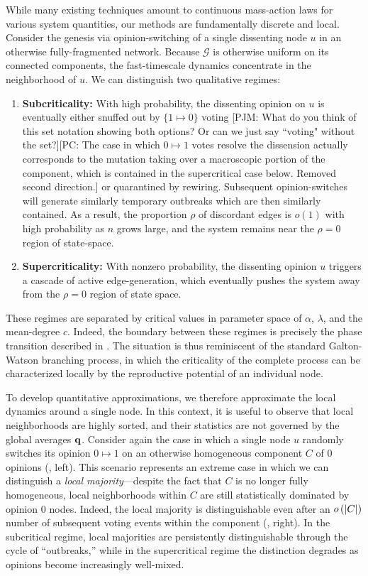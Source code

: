\documentclass[review, onefignum, onetabnum]{siamart171218}
\newcommand{\pjm}[1]{{\color{blue}[PJM: #1]}}
\newcommand{\pc}[1]{{\color{comment_purple}[PC: #1]}}
\begin{document}
	    While many existing techniques amount to continuous mass-action laws for various system quantities, our methods are fundamentally discrete and local. 
	    Consider the genesis via opinion-switching of a single dissenting node $u$ in an otherwise fully-fragmented network.  
	    Because $\mathcal{G}$ is otherwise uniform on its connected components, the fast-timescale dynamics concentrate in the neighborhood of $u$. 
    	We can distinguish two qualitative regimes: 
    	\begin{enumerate}
    		\item \textbf{Subcriticality:} With high probability, the dissenting opinion on $u$ is eventually either snuffed out by $\{1\mapsto 0\}$ voting \pjm{What do you think of this set notation showing both options? Or can we just say ``voting" without the set?}\pc{The case in which $0\mapsto1$ votes resolve the dissension actually corresponds to the mutation taking over a macroscopic portion of the component, which is contained in the supercritical case below. Removed second direction.} or quarantined by rewiring. 
    		Subsequent opinion-switches will generate similarly temporary outbreaks which are then similarly contained.   
    		As a result, the proportion $\rho$ of discordant edges is $o(1)$ with high probability as $n$ grows large, and the system remains near the $\rho = 0$ region of state-space. 
    		\item \textbf{Supercriticality:} With nonzero probability, the dissenting opinion $u$ triggers a cascade of active edge-generation, which eventually pushes the system away from the $\rho = 0$ region of state space. 
    	\end{enumerate}
    	These regimes are separated by critical values in parameter space of $\alpha$, $\lambda$, and the mean-degree $c$. 
    	Indeed, the boundary between these regimes is precisely the phase transition described in . 
    	The situation is thus reminiscent of the standard Galton-Watson branching process, in which the criticality of the complete process can be characterized locally by the reproductive potential of an individual node. 
    	
    	To develop quantitative approximations, we therefore approximate the local dynamics around a single node. 
    	In this context, it is useful to observe that local neighborhoods are highly sorted, and their statistics are not governed by the global averages $\mathbf{q}$. 
    	Consider again the case in which a single node $u$ randomly switches its opinion $0 \mapsto 1$ on an otherwise homogeneous component $C$ of $0$ opinions (, left). 
		This scenario represents an extreme case in which we can distinguish a \emph{local majority}---despite the fact that $C$ is no longer fully homogeneous, local neighborhoods within $C$ are still statistically dominated by opinion $0$ nodes. 
		Indeed, the local majority is distinguishable even after an $o\left(\left|C\right|\right)$ number of subsequent voting events within the component (, right). 
        In the subcritical regime, local majorities are persistently distinguishable through the cycle of ``outbreaks,'' while in the supercritical regime the distinction degrades as opinions become increasingly well-mixed. 
        
\end{document}
